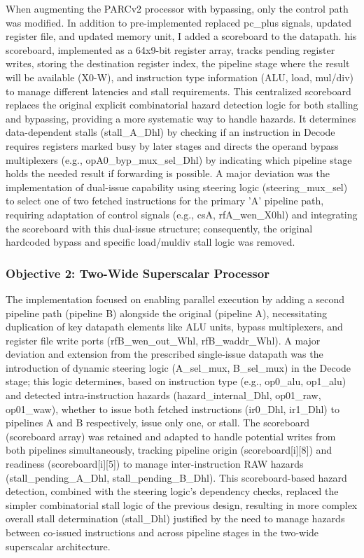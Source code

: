 \documentclass[11pt]{article}
\begin{document}
When augmenting the PARCv2 processor with bypassing, only the control path was
modified. In addition to pre-implemented replaced pc\_plus signals, updated
register file, and updated memory unit, I added a scoreboard to the datapath.
his scoreboard, implemented as a 64x9-bit register array, tracks pending
register writes, storing the destination register index, the pipeline stage
where the result will be available (X0-W), and instruction type information
(ALU, load, mul/div) to manage different latencies and stall requirements. This
centralized scoreboard replaces the original explicit combinatorial hazard
detection logic for both stalling and bypassing, providing a more systematic
way to handle hazards. It determines data-dependent stalls
(stall\_A\_Dhl) by checking if an instruction in Decode requires registers marked
busy by later stages and directs the operand bypass multiplexers (e.g.,
opA0\_byp\_mux\_sel\_Dhl) by indicating which pipeline stage holds the needed
result if forwarding is possible. A major deviation was the
implementation of dual-issue capability using steering logic (steering\_mux\_sel)
to select one of two fetched instructions for the primary 'A' pipeline path,
requiring adaptation of control signals (e.g., csA, rfA\_wen\_X0hl) and
integrating the scoreboard with this dual-issue structure; consequently, the
original hardcoded bypass and specific load/muldiv stall logic was removed.

\subsubsection*{Objective 2: Two-Wide Superscalar Processor}

The implementation focused on enabling parallel execution by adding a second
pipeline path (pipeline B) alongside the original (pipeline A), necessitating
duplication of key datapath elements like ALU units, bypass multiplexers, and
register file write ports (rfB\_wen\_out\_Whl, rfB\_waddr\_Whl). A major deviation
and extension from the prescribed single-issue datapath was the introduction of
dynamic steering logic (A\_sel\_mux, B\_sel\_mux) in the Decode stage; this logic
determines, based on instruction type (e.g., op0\_alu, op1\_alu) and detected
intra-instruction hazards (hazard\_internal\_Dhl, op01\_raw, op01\_waw), whether to
issue both fetched instructions (ir0\_Dhl, ir1\_Dhl) to pipelines A and B
respectively, issue only one, or stall. The scoreboard (scoreboard array) was
retained and adapted to handle potential writes from both pipelines
simultaneously, tracking pipeline origin (scoreboard[i][8]) and readiness
(scoreboard[i][5]) to manage inter-instruction RAW hazards
(stall\_pending\_A\_Dhl, stall\_pending\_B\_Dhl). This scoreboard-based hazard
detection, combined with the steering logic's dependency checks, replaced the
simpler combinatorial stall logic of the previous design, resulting in more
complex overall stall determination (stall\_Dhl) justified by the need to manage
hazards between co-issued instructions and across pipeline stages in the
two-wide superscalar architecture.
\end{document}
